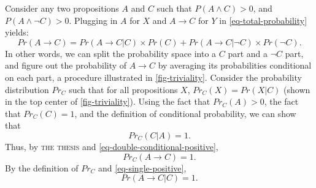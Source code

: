 Consider any two propositions $A$ and $C$ such that $P(A \wedge C) > 0$, and $P(A \wedge \neg C) > 0$.  Plugging in $A$ for $X$ and $A \rightarrow C$ for $Y$ in \autoref{eq-total-probability} yields:
%
\begin{equation}
\label{eq-crucial-instance}
Pr(A \rightarrow C) = Pr(A \rightarrow C|C)\times Pr(C) + Pr(A \rightarrow C|\neg C) \times Pr(\neg C).
\end{equation}
%
In other words, we can split the probability space into a $C$ part and a $\neg C$ part, and figure out the probability of $A \rightarrow C$ by averaging its probabilities conditional on each part, a procedure illustrated in \autoref{fig-triviality}.  Consider the probability distribution $Pr_C$ such that for all propositions $X$, $Pr_C(X) = Pr(X|C)$ (shown in the top center of \autoref{fig-triviality}). Using the fact that $Pr_C(A) >0$, the fact that $Pr_C(C) =1$, and the definition of conditional probability, we can show that
%
\begin{equation}
\label{eq-double-conditional-positive}
Pr_C(C|A) =1.
\end{equation}
%
Thus, by \textsc{the thesis} and \autoref{eq-double-conditional-positive},
%
\begin{equation}
\label{eq-single-positive}
Pr_C(A\rightarrow C) = 1.
\end{equation}
%
By the definition of $Pr_C$ and \autoref{eq-single-positive},
%
\begin{equation}
\label{eq-if-c}
Pr(A \rightarrow C| C) = 1.
\end{equation}

